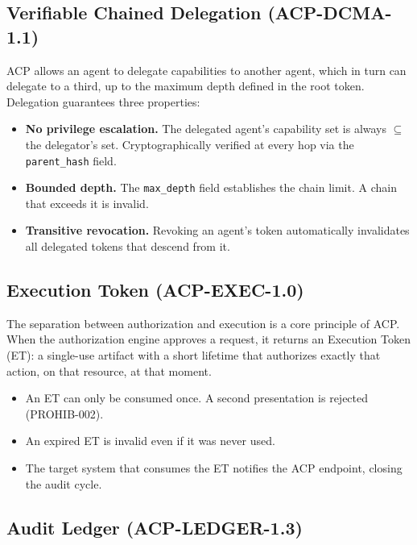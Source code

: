\documentclass[11pt]{article}
\theoremstyle{definition}
\begin{document}
\subsection{Verifiable Chained Delegation (ACP-DCMA-1.1)}

ACP allows an agent to delegate capabilities to another agent, which in turn can delegate to a third,
up to the maximum depth defined in the root token.
Delegation guarantees three properties:

\begin{itemize}[noitemsep]
  \item \textbf{No privilege escalation.}
        The delegated agent's capability set is always $\subseteq$ the delegator's set.
        Cryptographically verified at every hop via the \texttt{parent\_hash} field.
  \item \textbf{Bounded depth.}
        The \texttt{max\_depth} field establishes the chain limit. A chain that exceeds it is invalid.
  \item \textbf{Transitive revocation.}
        Revoking an agent's token automatically invalidates all delegated tokens that descend from it.
\end{itemize}

\subsection{Execution Token (ACP-EXEC-1.0)}

The separation between authorization and execution is a core principle of ACP.
When the authorization engine approves a request, it returns an Execution Token (ET):
a single-use artifact with a short lifetime that authorizes exactly that action, on that resource, at that moment.

\begin{itemize}[noitemsep]
  \item An ET can only be consumed once.
        A second presentation is rejected (PROHIB-002).
  \item An expired ET is invalid even if it was never used.
  \item The target system that consumes the ET notifies the ACP endpoint, closing the audit cycle.
\end{itemize}

\subsection{Audit Ledger (ACP-LEDGER-1.3)}
\end{document}
